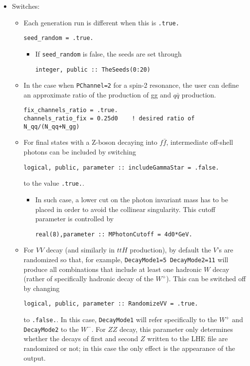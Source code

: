 \documentclass[aps,superscriptaddress,nofootinbib]{revtex4}
\begin{document}
\begin{itemize}
\item Switches:
\begin{itemize}
\item
Each generation run is different when this is \verb|.true.|

\begin{verbatim}
seed_random = .true.
\end{verbatim}

\begin{itemize}
\item
If \verb|seed_random| is false, the seeds are set through
\begin{verbatim}
integer, public :: TheSeeds(0:20)
\end{verbatim}
\end{itemize}

\item
In the case when \verb|PChannel=2| for a spin-2 resonance, the user can define an approximate ratio of the production of gg and $q\bar{q}$ production.

\begin{verbatim}
fix_channels_ratio = .true.
channels_ratio_fix = 0.25d0    ! desired ratio of N_qq/(N_qq+N_gg)
\end{verbatim}


\item
For final states with a Z-boson decaying into $f\bar f$, intermediate off-shell photons can be included by switching
\begin{verbatim}
logical, public, parameter :: includeGammaStar = .false.
\end{verbatim}
to the value \verb|.true.|.
\begin{itemize}
\item
In such case, a lower cut on the photon invariant mass has to be placed in order to avoid the collinear singularity. This cutoff parameter is controlled by
\begin{verbatim}
real(8),parameter :: MPhotonCutoff = 4d0*GeV.
\end{verbatim}
\end{itemize}

\item
For $VV$ decay (and similarly in $ttH$ production), by default the $V$'s are randomized so that, for example, \verb|DecayMode1=5 DecayMode2=11| will produce all combinations that include at least one hadronic $W$ decay (rather of specifically hadronic decay of the $W^+$).  This can be switched off by changing
\begin{verbatim}
logical, public, parameter :: RandomizeVV = .true.
\end{verbatim}
to \verb|.false.|.  In this case, \verb|DecayMode1| will refer specifically to the $W^+$ and \verb|DecayMode2| to the $W^-$.  For $ZZ$ decay, this parameter only determines whether the decays of first and second $Z$ written to the LHE file are randomized or not; in this case the only effect is the appearance of the output.


\end{itemize}
\end{itemize}
\end{document}
